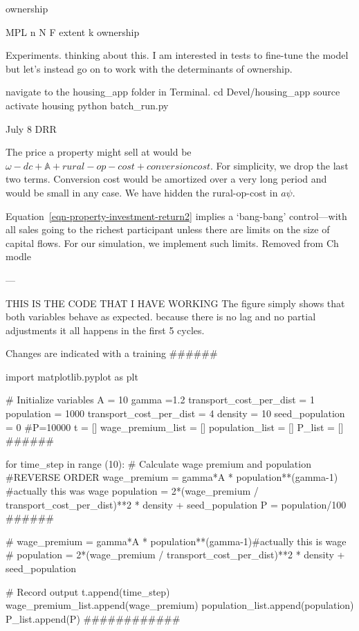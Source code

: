 ownership

MPL     n
N       F
extent  k   %
ownership       

Experiments. thinking about this. I am interested in tests to fine-tune the model but let's instead go on to work with the determinants of ownership. 



navigate to the housing_app folder in Terminal. cd Devel/housing_app
source activate housing
python batch_run.py


July 8 DRR

The price a property might sell at would be $\omega - {dc} + \mathbb{A} + rural-op-cost + conversion cost$. For simplicity, we drop the last two terms. Conversion cost would be amortized over a very long period and would be small in any case. We have hidden the rural-op-cost in $a\psi$.


Equation~\ref{eqn-property-investment-return2} implies a `bang-bang' control---with all sales going to the richest participant unless there are limits on the size of capital flows. For our simulation, we implement such limits.  Removed from Ch modle 


---

THIS IS THE CODE THAT I HAVE WORKING
The figure simply shows that both variables behave as expected.
because there is no lag and no partial adjustments it all happens in the first 5 cycles.


Changes are indicated with a training ######

import matplotlib.pyplot as plt

# Initialize variables
A     = 10
gamma =1.2
transport_cost_per_dist = 1
population = 1000
transport_cost_per_dist = 4
density = 10
seed_population = 0
#P=10000
t = []
wage_premium_list = []
population_list   = []
P_list            = []   ######

for time_step in range (10):
    # Calculate wage premium and population #REVERSE ORDER
    wage_premium = gamma*A * population**(gamma-1) #actually this was wage
    population =  2*(wage_premium / transport_cost_per_dist)**2 * density + seed_population
    P = population/100  ######
    
    # wage_premium = gamma*A * population**(gamma-1)#actually this is wage
    # population = 2*(wage_premium / transport_cost_per_dist)**2 * density + seed_population

    # Record output
    t.append(time_step)
    wage_premium_list.append(wage_premium)
    population_list.append(population)
    P_list.append(P)    ############

